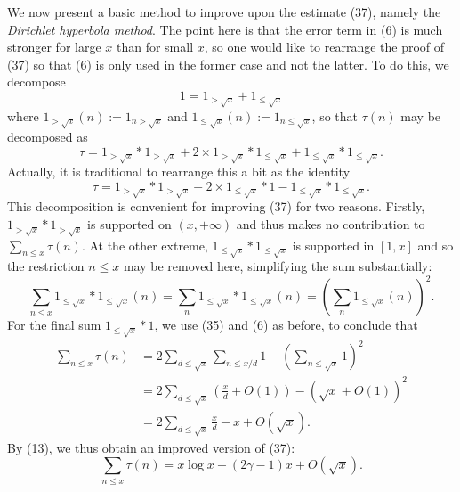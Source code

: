 \documentclass[10pt,reqno]{amsart}
\begin{document}
We now present a basic method to improve upon the estimate (37), namely the \emph{Dirichlet hyperbola method}. The point here is that the error term in (6) is much stronger for large $x$ than for small $x$, so one would like to rearrange the proof of (37) so that (6) is only used in the former case and not the latter. To do this, we decompose
%
\[  1 = 1_{>\sqrt{x}} + 1_{\leq \sqrt{x}}\]
%
where $1_{>\sqrt{x}}(n) := 1_{n > \sqrt{x}}$ and $1_{\leq \sqrt{x}}(n) := 1_{n \leq \sqrt{x}}$, so that $\tau(n)$ may be decomposed as
%
\[  \tau = 1_{>\sqrt{x}} * 1_{>\sqrt{x}} + 2 \times 1_{>\sqrt{x}} * 1_{\leq \sqrt{x}} + 1_{\leq \sqrt{x}} * 1_{\leq \sqrt{x}}.\]
%
Actually, it is traditional to rearrange this a bit as the identity
%
\begin{equation}   \tau = 1_{>\sqrt{x}} * 1_{>\sqrt{x}} + 2 \times 1_{\leq \sqrt{x}} * 1 - 1_{\leq \sqrt{x}} * 1_{\leq \sqrt{x}}. \end{equation}
%
This decomposition is convenient for improving (37) for two reasons. Firstly, $1_{>\sqrt{x}} * 1_{>\sqrt{x}}$ is supported on $(x,+\infty)$ and thus makes no contribution to $\sum_{n \leq x} \tau(n)$. At the other extreme, $1_{\leq \sqrt{x}} * 1_{\leq \sqrt{x}}$ is supported in $[1,x]$ and so the restriction $n \leq x$ may be removed here, simplifying the sum substantially:
%
\[  \sum_{n \leq x} 1_{\leq \sqrt{x}} * 1_{\leq \sqrt{x}}(n) = \sum_n 1_{\leq \sqrt{x}} * 1_{\leq \sqrt{x}}(n) = \left(\sum_n 1_{\leq \sqrt{x}}(n) \right)^2.\]
%
For the final sum $1_{\leq \sqrt{x}} * 1$, we use (35) and (6) as before, to conclude that
%
\begin{equation}
\begin{split}
    \sum_{n \leq x} \tau(n) &= 2 \sum_{d \leq \sqrt{x}} \sum_{n \leq x/d} 1 - (\sum_{n \leq \sqrt{x}} 1)^2\\
    &= 2 \sum_{d \leq \sqrt{x}} (\frac{x}{d} + O(1)) - (\sqrt{x} + O(1))^2\\
    &= 2 \sum_{d \leq \sqrt{x}} \frac{x}{d} - x+ O( \sqrt{x} ).
\end{split}
\end{equation}
%
By (13), we thus obtain an improved version of (37):
%
\begin{equation}   \sum_{n \leq x} \tau(n) = x\log x + (2\gamma - 1)x + O(\sqrt{x}). \end{equation}
\end{document}
